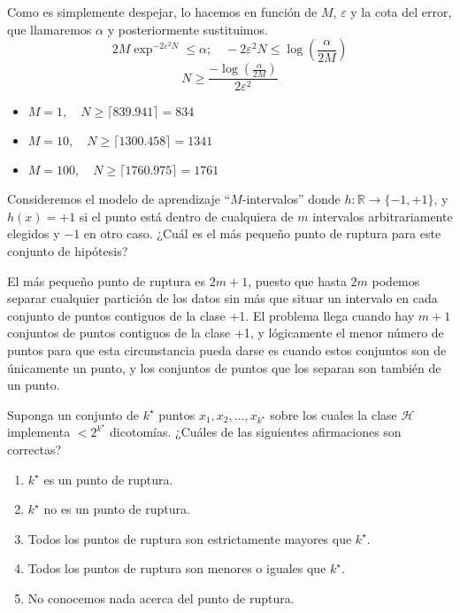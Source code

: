 \documentclass[11pt,leqno]{article}
\theoremstyle{definition}
\begin{document}
\begin{solucion}
Como es simplemente despejar, lo hacemos en función de $M$, $\varepsilon$ y la cota del error, que llamaremos $\alpha$ y posteriormente sustituimos.
\[2M\exp^{-2\varepsilon^2 N} \leq \alpha;\quad -2 \varepsilon^2 N \leq \log(\frac{\alpha}{2M}) \]
\[ N \geq \frac{-\log(\frac{\alpha}{2M})}{2 \varepsilon^2} \]
\begin{itemize}
\item $M=1, \quad N \geq \lceil 839.941 \rceil = 834$
\item $M=10, \quad N \geq \lceil 1300.458 \rceil = 1341$
\item $M=100, \quad N \geq \lceil 1760.975 \rceil = 1761$
\end{itemize}
\end{solucion}

\begin{cuestion}
Consideremos el modelo de aprendizaje ``$M$-intervalos'' donde $h: \mathbb{R} \rightarrow \{-1, +1\}$, y $h(x) = +1$ si el punto está dentro de cualquiera de $m$ intervalos arbitrariamente elegidos y $-1$ en otro caso. ¿Cuál es el más pequeño punto de ruptura para este conjunto de hipótesis?
\end{cuestion}

\begin{solucion}
El más pequeño punto de ruptura es $2m+1$, puesto que hasta $2m$ podemos separar cualquier partición de los datos sin más que situar un intervalo en cada conjunto de puntos contiguos de la clase +1. El problema llega cuando hay $m+1$ conjuntos de puntos contiguos de la clase +1, y lógicamente el menor número de puntos para que esta circunstancia pueda darse es cuando estos conjuntos son de únicamente un punto, y los conjuntos de puntos que los separan son también de un punto.
\end{solucion}

\begin{cuestion}
Suponga un conjunto de $k^\star$ puntos $x_1, x_2, \dots , x_{k^\star}$ sobre los cuales la clase $\mathcal{H}$ implementa $<2^{k^\star}$ dicotomías. ¿Cuáles de las siguientes afirmaciones son correctas?

\begin{enumerate}[a]
\item  $k^\star$ es un punto de ruptura.
\item  $k^\star$ no es un punto de ruptura.
\item  Todos los puntos de ruptura son estrictamente mayores que $k^\star$.
\item  Todos los puntos de ruptura son menores o iguales que $k^\star$.
\item  No conocemos nada acerca del punto de ruptura.
\end{enumerate}
\end{cuestion}
\end{document}
